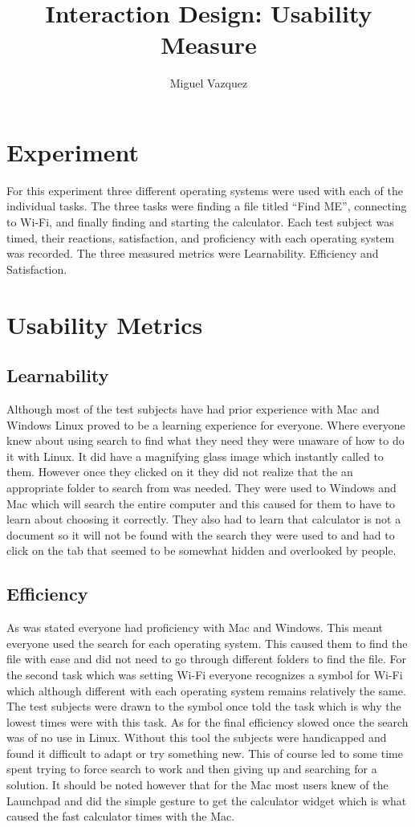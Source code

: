 \documentclass[11pt]{article}
\title{Interaction Design: Usability Measure}
\author{Miguel Vazquez}
\begin{document}
\maketitle
\tableofcontents

\section{Experiment}
For this experiment three different operating systems were used with each of the individual tasks. The three tasks were finding a file titled “Find ME”, connecting to Wi-Fi, and finally finding and starting the calculator. Each test subject was timed, their reactions, satisfaction, and proficiency with each operating system was recorded. The three measured metrics were Learnability. Efficiency and Satisfaction.
\section{Usability Metrics}

\subsection{Learnability}
Although most of the test subjects have had prior experience with Mac and Windows Linux proved to be a learning experience for everyone. Where everyone knew about using search to find what they need they were unaware of how to do it with Linux. It did have a magnifying glass image which instantly called to them. However once they clicked on it they did not realize that the an appropriate folder to search from was needed. They were used to Windows and Mac which will search the entire computer and this caused for them to have to learn about choosing it correctly. They also had to learn that calculator is not a document so it will not be found with the search they were used to and had to click on the tab that seemed to be somewhat hidden and overlooked by people.

\subsection{Efficiency}
As was stated everyone had proficiency with Mac and Windows. This meant everyone used the search for each operating system. This caused them to find the file with ease and did not need to go through different folders to find the file. For the second task which was setting Wi-Fi everyone recognizes a symbol for Wi-Fi which although different with each operating system remains relatively the same. The test subjects were drawn to the symbol once told the task which is why the lowest times were with this task. As for the final efficiency slowed once the search was of no use in Linux. Without this tool the subjects were handicapped and found it difficult to adapt or try something new. This of course led to some time spent trying to force search to work and then giving up and searching for a solution. It should be noted however that for the Mac most users knew of the Launchpad and did the simple gesture to get the calculator widget which is what caused the fast calculator times with the Mac.
\end{document}
